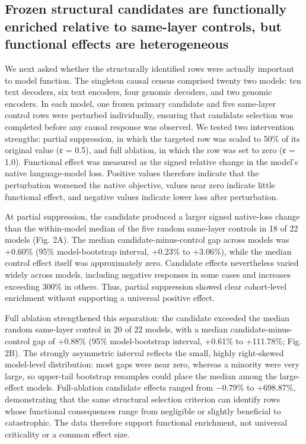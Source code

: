 \documentclass[11pt]{article}
\begin{document}
\subsection*{Frozen structural candidates are functionally enriched relative to same-layer controls, but functional effects are heterogeneous}
We next asked whether the structurally identified rows were actually important to model function. The singleton causal census comprised twenty two models: ten text decoders, six text encoders, four genomic decoders, and two genomic encoders. In each model, one frozen primary candidate and five same-layer control rows were perturbed individually, ensuring that candidate selection was completed before any causal response was observed. We tested two intervention strengths: partial suppression, in which the targeted row was scaled to 50\% of its original value (ε = 0.5), and full ablation, in which the row was set to zero (ε = 1.0). Functional effect was measured as the signed relative change in the model’s native language-model loss. Positive values therefore indicate that the perturbation worsened the native objective, values near zero indicate little functional effect, and negative values indicate lower loss after perturbation.

At partial suppression, the candidate produced a larger signed native-loss change than the within-model median of the five random same-layer controls in 18 of 22 models (Fig. 2A). The median candidate-minus-control gap across models was +0.60\% (95\% model-bootstrap interval, +0.23\% to +3.06\%), while the median control effect itself was approximately zero. Candidate effects nevertheless varied widely across models, including negative responses in some cases and increases exceeding 300\% in others. Thus, partial suppression showed clear cohort-level enrichment without supporting a universal positive effect.

Full ablation strengthened this separation: the candidate exceeded the median random same-layer control in 20 of 22 models, with a median candidate-minus-control gap of +0.88\% (95\% model-bootstrap interval, +0.61\% to +111.78\%; Fig. 2B). The strongly asymmetric interval reflects the small, highly right-skewed model-level distribution: most gaps were near zero, whereas a minority were very large, so upper-tail bootstrap resamples could place the median among the large-effect models. Full-ablation candidate effects ranged from −0.79\% to +698.87\%, demonstrating that the same structural selection criterion can identify rows whose functional consequences range from negligible or slightly beneficial to catastrophic. The data therefore support functional enrichment, not universal criticality or a common effect size.
\end{document}
